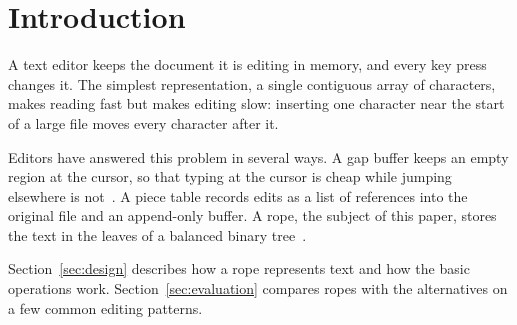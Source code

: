 \section{Introduction}
\label{sec:introduction}
A text editor keeps the document it is editing in memory, and every key
press changes it. The simplest representation, a single contiguous array of
characters, makes reading fast but makes editing slow: inserting one
character near the start of a large file moves every character after it.

Editors have answered this problem in several ways. A gap buffer keeps an
empty region at the cursor, so that typing at the cursor is cheap while
jumping elsewhere is not~\cite{gap}. A piece table records edits as a list
of references into the original file and an append-only buffer. A rope,
the subject of this paper, stores the text in the leaves of a balanced
binary tree~\cite{boehm}.

Section~\ref{sec:design} describes how a rope represents text and how the
basic operations work. Section~\ref{sec:evaluation} compares ropes with the
alternatives on a few common editing patterns.
